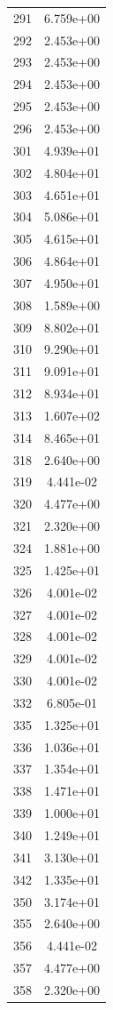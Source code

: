 \documentclass[12pt]{article}
\begin{document}
\begin{longtable}{@{}cc@{}}
291 & 6.759e+00 \\
292 & 2.453e+00 \\
293 & 2.453e+00 \\
294 & 2.453e+00 \\
295 & 2.453e+00 \\
296 & 2.453e+00 \\
301 & 4.939e+01 \\
302 & 4.804e+01 \\
303 & 4.651e+01 \\
304 & 5.086e+01 \\
305 & 4.615e+01 \\
306 & 4.864e+01 \\
307 & 4.950e+01 \\
308 & 1.589e+00 \\
309 & 8.802e+01 \\
310 & 9.290e+01 \\
311 & 9.091e+01 \\
312 & 8.934e+01 \\
313 & 1.607e+02 \\
314 & 8.465e+01 \\
318 & 2.640e+00 \\
319 & 4.441e-02 \\
320 & 4.477e+00 \\
321 & 2.320e+00 \\
324 & 1.881e+00 \\
325 & 1.425e+01 \\
326 & 4.001e-02 \\
327 & 4.001e-02 \\
328 & 4.001e-02 \\
329 & 4.001e-02 \\
330 & 4.001e-02 \\
332 & 6.805e-01 \\
335 & 1.325e+01 \\
336 & 1.036e+01 \\
337 & 1.354e+01 \\
338 & 1.471e+01 \\
339 & 1.000e+01 \\
340 & 1.249e+01 \\
341 & 3.130e+01 \\
342 & 1.335e+01 \\
350 & 3.174e+01 \\
355 & 2.640e+00 \\
356 & 4.441e-02 \\
357 & 4.477e+00 \\
358 & 2.320e+00 \\

\end{longtable}
\end{document}
